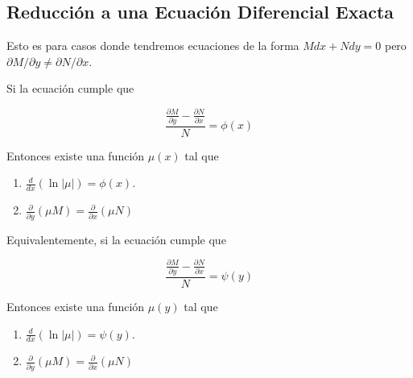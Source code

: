 
\subsection{Reducción a una Ecuación Diferencial Exacta}

Esto es para casos donde tendremos ecuaciones de la forma $Mdx + Ndy = 0$ pero $\partial M / \partial y \neq \partial N / \partial x$.

Si la ecuación cumple que

\[
    \displaystyle\frac{\displaystyle\frac{\partial M}{\partial y} - \frac{\partial N}{\partial x}}{N} = \phi(x)
\]

Entonces existe una función $\mu(x)$ tal que

\begin{enumerate}
    \item $\displaystyle\frac{d}{dx}\left( \ln |\mu| \right) = \phi(x)$.
    \item $\displaystyle\frac{\partial}{\partial y} (\mu M) = \frac{\partial}{\partial x} (\mu N)$
\end{enumerate}

Equivalentemente, si la ecuación cumple que

\[
    \displaystyle\frac{\displaystyle\frac{\partial M}{\partial y} - \frac{\partial N}{\partial x}}{N} = \psi(y)
\]

Entonces existe una función $\mu(y)$ tal que

\begin{enumerate}
    \item $\displaystyle\frac{d}{dx}\left( \ln |\mu| \right) = \psi(y)$.
    \item $\displaystyle\frac{\partial}{\partial y} (\mu M) = \frac{\partial}{\partial x} (\mu N)$
\end{enumerate}

